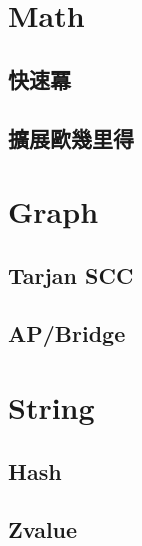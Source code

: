 \section{Math}
\subsection{快速冪} 

\subsection{擴展歐幾里得} 


\section{Graph}
\subsection{Tarjan SCC} 

\subsection{AP/Bridge} 


\section{String}
\subsection{Hash} 

\subsection{Zvalue} 
